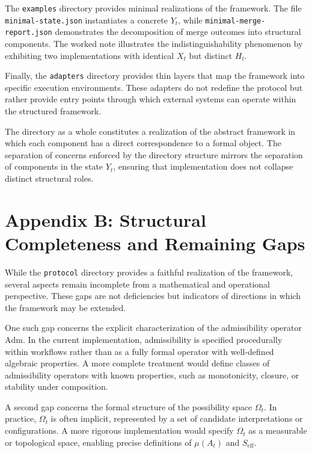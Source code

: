 \documentclass[11pt,oneside]{article}
\begin{document}
The \texttt{examples} directory provides minimal realizations of the framework. The file \texttt{minimal-state.json} instantiates a concrete \( Y_t \), while \texttt{minimal-merge-report.json} demonstrates the decomposition of merge outcomes into structural components. The worked note illustrates the indistinguishability phenomenon by exhibiting two implementations with identical \( X_t \) but distinct \( H_t \).

Finally, the \texttt{adapters} directory provides thin layers that map the framework into specific execution environments. These adapters do not redefine the protocol but rather provide entry points through which external systems can operate within the structured framework.

The directory as a whole constitutes a realization of the abstract framework in which each component has a direct correspondence to a formal object. The separation of concerns enforced by the directory structure mirrors the separation of components in the state \( Y_t \), ensuring that implementation does not collapse distinct structural roles.

\section{Appendix B: Structural Completeness and Remaining Gaps}

While the \texttt{protocol} directory provides a faithful realization of the framework, several aspects remain incomplete from a mathematical and operational perspective. These gaps are not deficiencies but indicators of directions in which the framework may be extended.

One such gap concerns the explicit characterization of the admissibility operator \( \mathrm{Adm} \). In the current implementation, admissibility is specified procedurally within workflows rather than as a fully formal operator with well-defined algebraic properties. A more complete treatment would define classes of admissibility operators with known properties, such as monotonicity, closure, or stability under composition.

A second gap concerns the formal structure of the possibility space \( \Omega_t \). In practice, \( \Omega_t \) is often implicit, represented by a set of candidate interpretations or configurations. A more rigorous implementation would specify \( \Omega_t \) as a measurable or topological space, enabling precise definitions of \( \mu(A_t) \) and \( S_{\mathrm{eff}} \).
\end{document}
